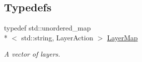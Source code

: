 \subsection*{Typedefs}
\begin{DoxyCompactItemize}
\item 
\hypertarget{namespacekdb_ac389d72a0c7be0c026628870f81148fe}{typedef std\+::unordered\+\_\+map\\*
$<$ std\+::string, Layer\+Action $>$ \hyperlink{namespacekdb_ac389d72a0c7be0c026628870f81148fe}{Layer\+Map}}\label{namespacekdb_ac389d72a0c7be0c026628870f81148fe}

\begin{DoxyCompactList}\small\item\em A vector of layers. \end{DoxyCompactList}\end{DoxyCompactItemize}
